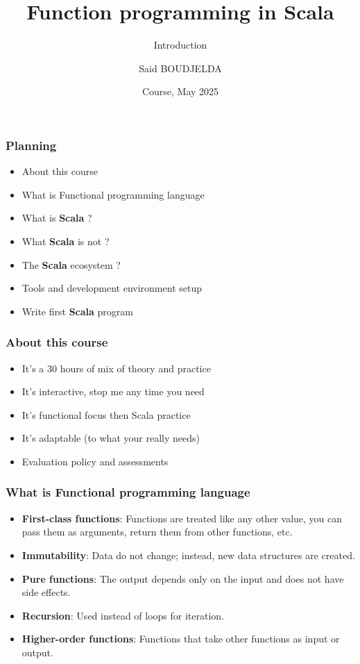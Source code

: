\documentclass{beamer}
\title[Scala] %
{Function programming in Scala}
\subtitle{Introduction}
\author[Said BOUDJELDA] %
{Said BOUDJELDA}
\institute[efrei] %
{
  Senior Software Engineer @SCIAM\\
  Follow me on GitHub @bmscomp
}
\date[efrei 2025] %
{Course, May 2025}
\begin{document}
\frame{\titlepage}

\begin{frame}
\frametitle{Planning}


\begin{itemize}
    \item About this course 
    \item What is Functional programming language
    \item What is \textbf{Scala} ? 
    \item What \textbf{Scala} is not ? 
    \item The \textbf{Scala} ecosystem ? 
    \item Tools and development environment setup
    \item Write first \textbf{Scala} program
\end{itemize}
\end{frame}


\begin{frame}
\frametitle{About this course}

\begin{itemize}
    \item It's a 30 hours of mix of theory and practice
    \item It's interactive, stop me any time you need
    \item It's functional focus then Scala practice
    \item It's adaptable (to what your really needs)
    \item Evaluation policy and assessments
\end{itemize}
\end{frame}



\begin{frame}
\frametitle{What is Functional programming language}

\begin{itemize}
    \item \textbf{First-class functions}: Functions are treated like any other value, you can pass them as arguments, return them from other functions, etc.
    \item \textbf{Immutability}: Data do not change; instead, new data structures are created.
    \item \textbf{Pure functions}: The output depends only on the input and does not have side effects.
    \item \textbf{Recursion}: Used instead of loops for iteration.
    \item \textbf{Higher-order functions}: Functions that take other functions as input or output.
\end{itemize}
\end{frame}
\end{document}
